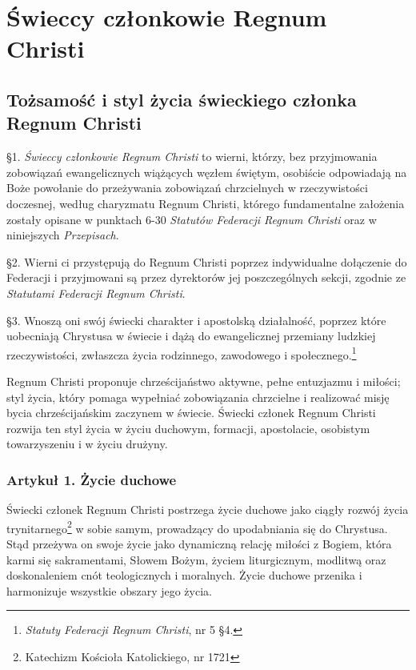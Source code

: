 \part{Świeccy członkowie Regnum Christi}

\chapter{Tożsamość i styl życia świeckiego członka Regnum Christi}


 \S{}1. {\em Świeccy członkowie Regnum Christi} to wierni, którzy, bez przyjmowania zobowiązań ewangelicznych wiążących węzłem świętym, osobiście odpowiadają na Boże powołanie do przeżywania zobowiązań chrzcielnych w rzeczywistości doczesnej, według charyzmatu Regnum Christi, którego fundamentalne założenia zostały opisane w punktach 6-30 {\em Statutów Federacji Regnum Christi} oraz w niniejszych {\em Przepisach}.

\S{}2. Wierni ci przystępują do Regnum Christi poprzez indywidualne dołączenie do Federacji i przyjmowani są przez dyrektorów jej poszczególnych sekcji, zgodnie ze {\em Statutami Federacji Regnum Christi}.

\S{}3. Wnoszą oni swój świecki charakter i apostolską działalność, poprzez które uobecniają Chrystusa w świecie i dążą do ewangelicznej przemiany ludzkiej rzeczywistości, zwłaszcza życia rodzinnego, zawodowego i społecznego.\footnote{{\em Statuty Federacji Regnum Christi}, nr 5 \S{}4.}


 \label{numerdwa}
Regnum Christi proponuje chrześcijaństwo aktywne, pełne entuzjazmu i miłości; styl życia, który pomaga wypełniać zobowiązania chrzcielne i realizować misję bycia chrześcijańskim zaczynem w świecie. Świecki członek Regnum Christi rozwija ten styl życia w życiu duchowym, formacji, apostolacie, osobistym towarzyszeniu i w życiu drużyny.


\section{Artykuł 1. Życie duchowe}


 Świecki członek Regnum Christi postrzega życie duchowe jako ciągły rozwój życia trynitarnego\footnote{Katechizm Kościoła Katolickiego, nr 1721} w sobie samym, prowadzący do upodabniania się do Chrystusa. Stąd przeżywa on swoje życie jako dynamiczną relację miłości z Bogiem, która karmi się sakramentami, Słowem Bożym, życiem liturgicznym, modlitwą oraz doskonaleniem cnót teologicznych i moralnych. Życie duchowe przenika i harmonizuje wszystkie obszary jego życia.

